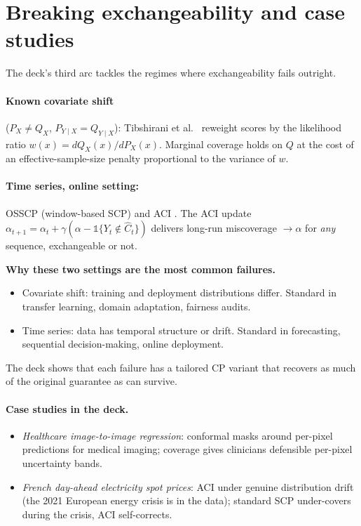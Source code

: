 \documentclass[letterpaper,11pt,leqno]{article}
\begin{document}
\section{Breaking exchangeability and case studies}\label{s:break}

The deck's third arc tackles the regimes where exchangeability fails outright.

\paragraph{Known covariate shift} ($P_X \neq Q_X$, $P_{Y \mid X} = Q_{Y \mid X}$): Tibshirani et al.\ \cite{tibshirani2019weighted} reweight scores by the likelihood ratio $w(x) = dQ_X(x)/dP_X(x)$. Marginal coverage holds on $Q$ at the cost of an effective-sample-size penalty proportional to the variance of $w$.

\paragraph{Time series, online setting:} OSSCP (window-based SCP) and ACI \cite{gibbs2021aci}. The ACI update $\alpha_{t+1} = \alpha_t + \gamma(\alpha - \mathbb{1}\{Y_t \notin \hat{C}_t\})$ delivers long-run miscoverage $\to \alpha$ for \emph{any} sequence, exchangeable or not.

\begin{explain}
\textbf{Why these two settings are the most common failures.}
\begin{itemize}
\item Covariate shift: training and deployment distributions differ. Standard in transfer learning, domain adaptation, fairness audits.
\item Time series: data has temporal structure or drift. Standard in forecasting, sequential decision-making, online deployment.
\end{itemize}
The deck shows that each failure has a tailored CP variant that recovers as much of the original guarantee as can survive.
\end{explain}

\paragraph{Case studies in the deck.}
\begin{itemize}
\item \emph{Healthcare image-to-image regression}: conformal masks around per-pixel predictions for medical imaging; coverage gives clinicians defensible per-pixel uncertainty bands.
\item \emph{French day-ahead electricity spot prices}: ACI under genuine distribution drift (the 2021 European energy crisis is in the data); standard SCP under-covers during the crisis, ACI self-corrects.
\end{itemize}
\end{document}
